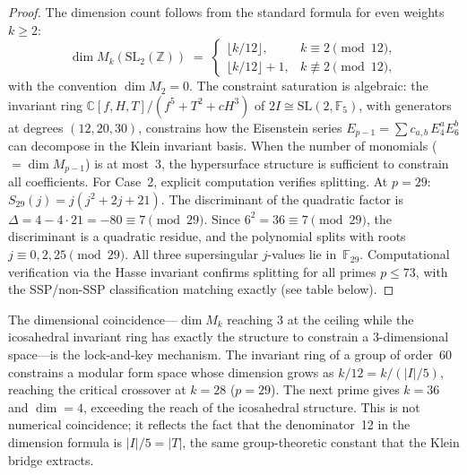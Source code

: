 \documentclass[11pt,letterpaper]{article}
\theoremstyle{definition}
\newcommand{\ZZ}{\mathbb{Z}}
\newcommand{\FF}{\mathbb{F}}
\newcommand{\abs}[1]{\lvert #1 \rvert}
\begin{document}
\begin{proof}
The dimension count follows from the standard formula for even weights $k\ge 2$:
\[
\dim M_k(\mathrm{SL}_2(\ZZ)) \;=\;
\begin{cases}
\lfloor k/12\rfloor, & k\equiv 2 \pmod{12},\\[4pt]
\lfloor k/12\rfloor + 1, & k\not\equiv 2 \pmod{12},
\end{cases}
\]
with the convention $\dim M_2=0$.  The constraint saturation is algebraic: the invariant ring $\mathbb{C}[f,H,T]/(f^5{+}T^2{+}cH^3)$ of $2I\cong\mathrm{SL}(2,\FF_5)$, with generators at degrees $(12,20,30)$, constrains how the Eisenstein series $E_{p-1}=\sum c_{a,b}\,E_4^a E_6^b$ can decompose in the Klein invariant basis.  When the number of monomials ($= \dim M_{p-1}$) is at most~3, the hypersurface structure is sufficient to constrain all coefficients.
For Case~2, explicit computation verifies splitting.  At $p=29$: $S_{29}(j)=j(j^2+2j+21)$.  The discriminant of the quadratic factor is $\Delta=4-4\cdot21=-80\equiv 7\pmod{29}$.  Since $6^2=36\equiv 7\pmod{29}$, the discriminant is a quadratic residue, and the polynomial splits with roots $j\equiv 0,2,25\pmod{29}$.  All three supersingular $j$-values lie in~$\FF_{29}$.  Computational verification via the Hasse invariant confirms splitting for all primes $p\le 73$, with the SSP/non-SSP classification matching exactly (see table below).
\end{proof}
\begin{remarkbox}
The dimensional coincidence---$\dim M_k$ reaching 3 at the ceiling while the icosahedral invariant ring has exactly the structure to constrain a 3-dimensional space---is the lock-and-key mechanism.  The invariant ring of a group of order~60 constrains a modular form space whose dimension grows as $k/12=k/(\abs{I}/5)$, reaching the critical crossover at $k=28$ ($p=29$).  The next prime gives $k=36$ and $\dim=4$, exceeding the reach of the icosahedral structure.  This is not numerical coincidence; it reflects the fact that the denominator~12 in the dimension formula is $\abs{I}/5=\abs{T}$, the same group-theoretic constant that the Klein bridge extracts.
\end{remarkbox}
\end{document}

